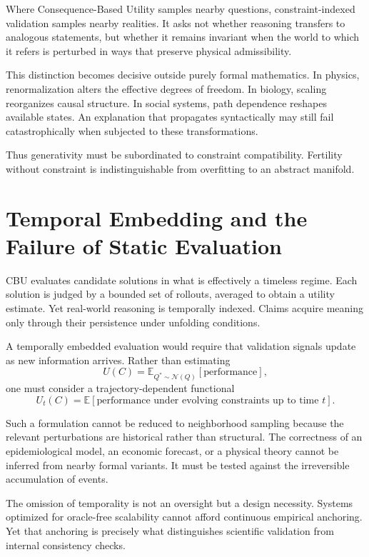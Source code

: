 \documentclass[12pt]{article}
\begin{document}
Where Consequence-Based Utility samples nearby questions, constraint-indexed validation samples nearby realities. It asks not whether reasoning transfers to analogous statements, but whether it remains invariant when the world to which it refers is perturbed in ways that preserve physical admissibility.

This distinction becomes decisive outside purely formal mathematics. In physics, renormalization alters the effective degrees of freedom. In biology, scaling reorganizes causal structure. In social systems, path dependence reshapes available states. An explanation that propagates syntactically may still fail catastrophically when subjected to these transformations.

Thus generativity must be subordinated to constraint compatibility. Fertility without constraint is indistinguishable from overfitting to an abstract manifold.

\section{Temporal Embedding and the Failure of Static Evaluation}

CBU evaluates candidate solutions in what is effectively a timeless regime. Each solution is judged by a bounded set of rollouts, averaged to obtain a utility estimate. Yet real-world reasoning is temporally indexed. Claims acquire meaning only through their persistence under unfolding conditions.

A temporally embedded evaluation would require that validation signals update as new information arrives. Rather than estimating
\[
U(C) = \mathbb{E}_{Q^\ast \sim \mathcal{N}(Q)}[\text{performance}],
\]
one must consider a trajectory-dependent functional
\[
U_t(C) = \mathbb{E}[\text{performance under evolving constraints up to time } t].
\]

Such a formulation cannot be reduced to neighborhood sampling because the relevant perturbations are historical rather than structural. The correctness of an epidemiological model, an economic forecast, or a physical theory cannot be inferred from nearby formal variants. It must be tested against the irreversible accumulation of events.

The omission of temporality is not an oversight but a design necessity. Systems optimized for oracle-free scalability cannot afford continuous empirical anchoring. Yet that anchoring is precisely what distinguishes scientific validation from internal consistency checks.
\end{document}
